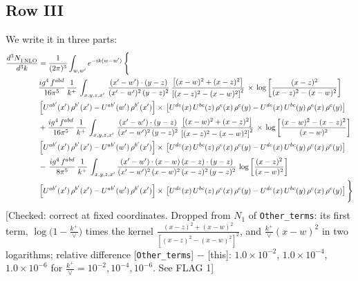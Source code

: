 \documentclass[9pt]{article}
\numberwithin{equation}{section}
\begin{document}
\subsection{Row III}
We write it in three parts:
\begin{align}
   \frac{d^{3}N_{1\,\rm NLO}^{\rm}}{d^{3}k}  & =  \frac{1}{(2\pi)^{3}}  \int_{w, w^\prime} e^{-ik(w-w^\prime)}\, \Bigg\{\notag \\
& \frac{ig^{4}\,f^{abd}}{16\pi^{5}}\, \frac{1}{k^{+}}\,\int_{x,y,z,x'}\, \frac{(x'-w')\cdot (y-z)}{(x'-w')^{2}\,(y-z)^{2}}\, \frac{\left[(x-w)^{2}+(x-z)^{2}\right]}{\left[(x-z)^{2}-(x-w)^{2}\right]^{2}}\, \times\, \log{\left[\frac{(x-z)^{2}}{(x-z)^{2}-(x-w)^{2}}\right]}\notag \\ & \left[U^{ab'}(x')\,\rho^{b'}(x')-U^{ab'}(w')\, \rho^{b'}(x')\right]\times\, \left[U^{de}(x)\,U^{bc}(z)\, \rho^{e}(x)\,\rho^{c}(y)-U^{de}(x)\,U^{bc}(y)\,\rho^{e}(x)\,\rho^{c}(y)\right] \notag \\
&  +\frac{ig^{4}\,f^{abd}}{16\pi^{5}}\, \frac{1}{k^{+}}\,\int_{x,y,z,x'}\, \frac{(x'-w')\cdot (y-z)}{(x'-w')^{2}\,(y-z)^{2}}\, \frac{\left[(x-w)^{2}+(x-z)^{2}\right]}{\left[(x-z)^{2}-(x-w)^{2}\right]^{2}}\, \times\, \log{\left[\frac{(x-w)^{2}-(x-z)^{2}}{(x-w)^{2}}\right]}\notag \\ & \left[U^{ab'}(x')\,\rho^{b'}(x')-U^{ab'}(w')\, \rho^{b'}(x')\right]\times\, \left[U^{de}(x)\,U^{bc}(z)\, \rho^{e}(x)\,\rho^{c}(y)-U^{de}(x)\,U^{bc}(y)\,\rho^{e}(x)\,\rho^{c}(y)\right] \notag \\
&-\, \frac{ig^{4}\,f^{abd}}{8\pi^{5}}\,\frac{1}{k^{+}}\,\int_{x,y,z,x'}\frac{(x'-w')\cdot (x-w)\, (x-z)\cdot (y-z)}{(x'-w')^{2}\, (x-w)^{2}\, (x-z)^{2}\, (y-z)^{2}}\,\log{\left[\frac{(x-z)^{2}}{(x-w)^{2}}\right]} \notag \\ & \left[U^{ab'}(x')\,\rho^{b'}(x')-U^{ab'}(w')\, \rho^{b'}(x')\right]\times\, \left[U^{de}(x)\,U^{bc}(z)\, \rho^{e}(x)\,\rho^{c}(y)-U^{de}(x)\,U^{bc}(y)\,\rho^{e}(x)\,\rho^{c}(y)\right]\Bigg\}
\end{align} {\color{red}[Checked: correct at fixed coordinates. Dropped from $N_{1}$ of \texttt{Other\_terms}: its first term, $\log\big(1-\frac{k^{+}}{\vee}\big)$ times the kernel $\frac{(x-z)^{2}+(x-w)^{2}}{[(x-z)^{2}-(x-w)^{2}]^{2}}$, and $\frac{k^{+}}{\vee}(x-w)^{2}$ in two logarithms; relative difference [\texttt{Other\_terms}] $-$ [this]: $1.0\times10^{-2}$, $1.0\times10^{-4}$, $1.0\times10^{-6}$ for $\frac{k^{+}}{\vee}=10^{-2},10^{-4},10^{-6}$. See FLAG 1]}\par\noindent
\end{document}
